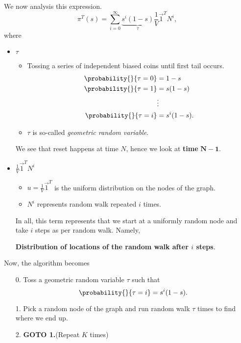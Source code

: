We now analysis this expression.
\[
	\pi^{T}(s) = \sum\limits_{i=0}^{\infty} \underbrace{s^i (1 - s)}_{\tau}\frac{1}{V}\vec{1}^{T}N^i,
\]
where
\begin{itemize}
	\item \(\tau\)
	      \begin{itemize}
		      \item Tossing a series of independent biased coins until first tail occurs.
		            \[
			            \begin{split}
				            \probability{}{\tau = 0} &= 1 - s\\
				            \probability{}{\tau = 1} &= s(1 - s)\\
				            &\vdots\\
				            \probability{}{\tau = i} &= s^i(1 - s).
			            \end{split}
		            \]
		      \item \(\tau\) is so-called \emph{geometric random variable}.
	      \end{itemize}
	      We see that reset happens at time \(N\), hence we look at \textbf{time} \(\bm{N-1}\).
	\item \(\frac{1}{V}\vec{1}^{T}N^i\)
	      \begin{itemize}
		      \item \(u = \frac{1}{V}\vec{1}^{T}\) is the uniform distribution on the nodes of the graph.
		      \item \(N^i\) represents random walk repeated \(i\) times.
	      \end{itemize}
	      In all, this term represents that we start at a uniformly random node and take \(i\) steps as per random walk. Namely,
	      \begin{center}
		      \textbf{Distribution of locations of the random walk after \(i\) steps}.
	      \end{center}
\end{itemize}

\hr

Now, the algorithm becomes
\begin{enumerate}
	\item[0.] Toss a geometric random variable \(\tau\) such that
		\[
			\probability{}{\tau = i} = s^i(1 - s).
		\]
	\item[1.] Pick a random node of the graph and run random walk \(\tau\) times to find where we end up.
	\item[2.] \textbf{GOTO 1.}(Repeat \(K\) times)
\end{enumerate}

